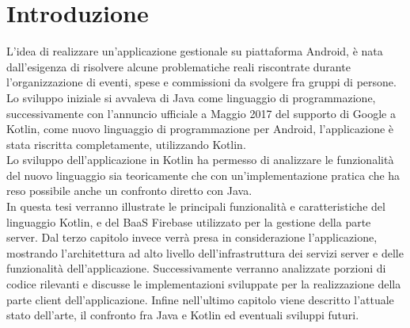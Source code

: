 \chapter*{Introduzione}                 %

L'idea di realizzare un'applicazione gestionale su piattaforma Android, è nata dall'esigenza di risolvere alcune problematiche reali riscontrate durante l'organizzazione di eventi, spese e commissioni da svolgere fra gruppi di persone.\\
Lo sviluppo iniziale si avvaleva di Java come linguaggio di programmazione, successivamente con l'annuncio ufficiale a Maggio 2017 del supporto di Google a Kotlin, come nuovo linguaggio di programmazione per Android, l'applicazione è stata riscritta completamente, utilizzando Kotlin.\\ %
Lo sviluppo dell'applicazione in Kotlin ha permesso di analizzare le funzionalità del nuovo linguaggio sia teoricamente che con un'implementazione pratica che ha reso possibile anche un confronto diretto con Java.\\
In questa tesi verranno illustrate le principali funzionalità e caratteristiche del linguaggio Kotlin, e del BaaS Firebase utilizzato per la gestione della parte server. Dal terzo capitolo invece verrà presa in considerazione l'applicazione, mostrando l'architettura ad alto livello dell'infrastruttura dei servizi server e delle funzionalità dell'applicazione. Successivamente verranno analizzate porzioni di codice rilevanti e discusse le implementazioni sviluppate per la realizzazione della parte client dell'applicazione. Infine nell'ultimo capitolo viene descritto l'attuale stato dell'arte, il confronto fra Java e Kotlin ed eventuali sviluppi futuri.
\clearpage{\pagestyle{empty}\cleardoublepage}
